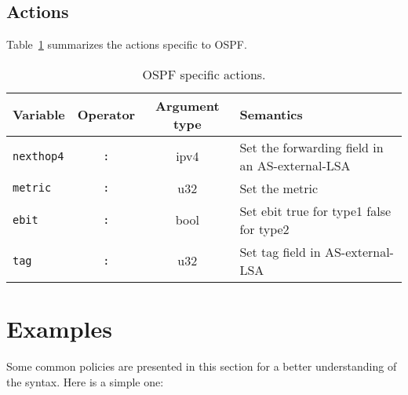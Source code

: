 \subsection{Actions}
Table~\ref{policy_ospf_action} summarizes the actions specific to OSPF.
\begin{table}[h]
\centering
\begin{tabular}{|l|c|c|p{7cm}|}
\hline
Variable & Operator & Argument type & Semantics \\
\hline\hline
{\tt nexthop4} & {\tt :} & ipv4 & Set the forwarding field in an
AS-external-LSA \\

\hline
{\tt metric} & {\tt :} & u32 & Set the metric \\
\hline

\hline
{\tt ebit} & {\tt :} & bool & Set ebit true for type1 false for type2 \\
\hline

\hline
{\tt tag} & {\tt :} & u32 & Set tag field in AS-external-LSA \\
\hline

\end{tabular}
\caption{\label{policy_ospf_action}OSPF specific actions.}
\end{table}

\section{Examples}
Some common policies are presented in this section for a better understanding of
the syntax.  Here is a simple one:

\noindent{}

